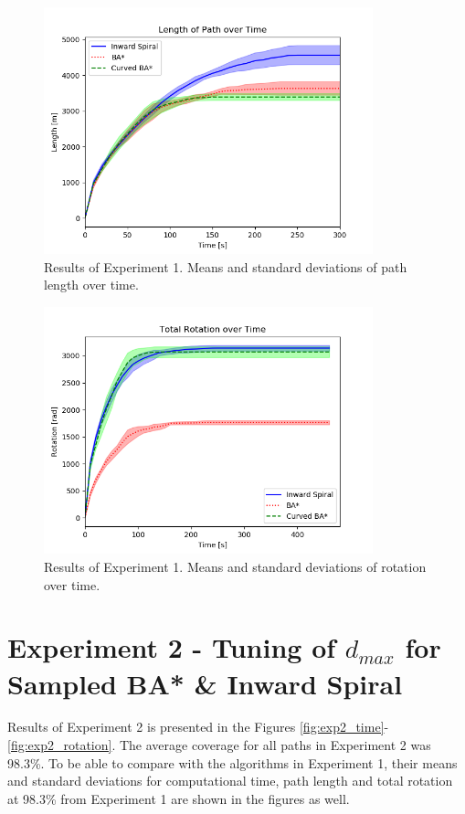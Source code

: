 \begin{figure}
\centering
    \includegraphics[width=0.85\textwidth]{figures/exp1_length.png}
    \caption{Results of Experiment 1. Means and standard deviations of path length over time.}
    \label{fig:exp1_length}
\end{figure}


\begin{figure}
\centering
    \includegraphics[width=0.85\textwidth]{figures/exp1_rotation.png}
    \caption{Results of Experiment 1. Means and standard deviations of rotation over time.}
    \label{fig:exp1_rotation}
\end{figure}

\section{Experiment 2 - Tuning of $d_{max}$ for Sampled BA* \& Inward Spiral}
Results of Experiment 2 is presented in the Figures \ref{fig:exp2_time}-\ref{fig:exp2_rotation}. The average coverage for all paths in Experiment 2 was 98.3\%. To be able to compare with the algorithms in Experiment 1, their means and standard deviations for computational time, path length and total rotation at 98.3\% from Experiment 1 are shown in the figures as well.

